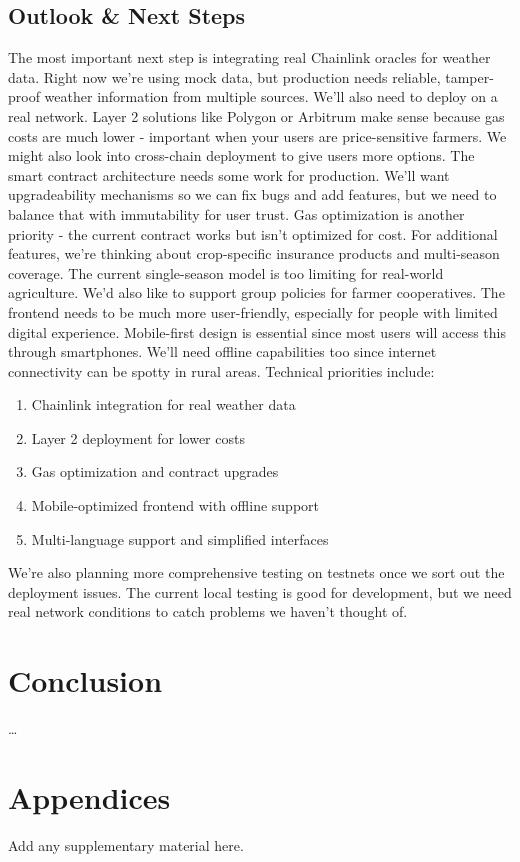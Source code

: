 \documentclass[11pt,a4paper]{article}
\begin{document}
    \subsection{Outlook \& Next Steps}\label{subsec:outlook}
    The most important next step is integrating real Chainlink oracles for weather data.
    Right now we're using mock data, but production needs reliable, tamper-proof weather information from multiple sources.
    We'll also need to deploy on a real network.
    Layer 2 solutions like Polygon or Arbitrum make sense because gas costs are much lower - important when your users are price-sensitive farmers.
    We might also look into cross-chain deployment to give users more options.
    The smart contract architecture needs some work for production.
    We'll want upgradeability mechanisms so we can fix bugs and add features, but we need to balance that with immutability for user trust.
    Gas optimization is another priority - the current contract works but isn't optimized for cost.
    For additional features, we're thinking about crop-specific insurance products and multi-season coverage.
    The current single-season model is too limiting for real-world agriculture.
    We'd also like to support group policies for farmer cooperatives.
    The frontend needs to be much more user-friendly, especially for people with limited digital experience.
    Mobile-first design is essential since most users will access this through smartphones.
    We'll need offline capabilities too since internet connectivity can be spotty in rural areas.
    Technical priorities include:

    \begin{enumerate}
        \item Chainlink integration for real weather data
        \item Layer 2 deployment for lower costs
        \item Gas optimization and contract upgrades
        \item Mobile-optimized frontend with offline support
        \item Multi-language support and simplified interfaces
    \end{enumerate}

    We're also planning more comprehensive testing on testnets once we sort out the deployment issues.
    The current local testing is good for development, but we need real network conditions to catch problems we haven't thought of.


    \section{Conclusion}\label{sec:conclusion}
    \ldots

    \printbibliography

    \appendix
    \section*{Appendices}\label{sec:appendix}
    Add any supplementary material here.
\end{document}
